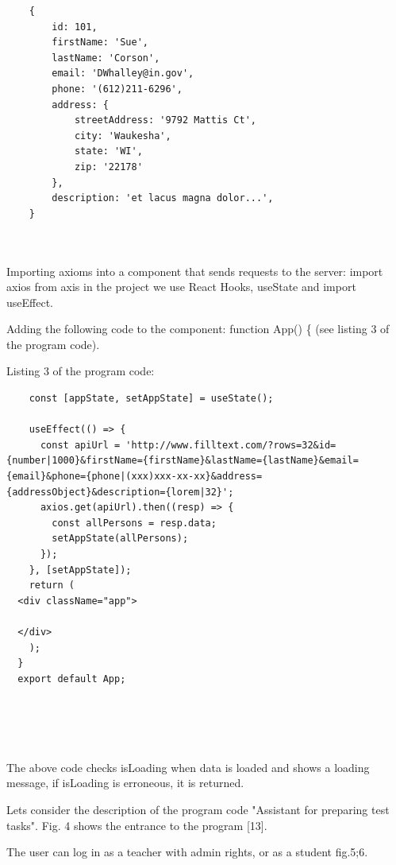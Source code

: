 \begin{lstlisting}
	{
		id: 101,
		firstName: 'Sue',
		lastName: 'Corson',
		email: 'DWhalley@in.gov',
		phone: '(612)211-6296',
		address: {
			streetAddress: '9792 Mattis Ct',
			city: 'Waukesha',
			state: 'WI',
			zip: '22178'
		},
		description: 'et lacus magna dolor...',
	}



\end{lstlisting}

\begin{multicols}{2}


Importing axioms into a component that sends requests to the server:
import axios from \textquotesingle axis\textquotesingle{} in the project
we use React Hooks, useState and import useEffect.

Adding the following code to the component: function App() \{ (see
listing 3 of the program code).

Listing 3 of the program code:
\end{multicols}

\begin{lstlisting}
	const [appState, setAppState] = useState();

	useEffect(() => {
	  const apiUrl = 'http://www.filltext.com/?rows=32&id={number|1000}&firstName={firstName}&lastName={lastName}&email={email}&phone={phone|(xxx)xxx-xx-xx}&address={addressObject}&description={lorem|32}';
	  axios.get(apiUrl).then((resp) => {
		const allPersons = resp.data;
		setAppState(allPersons);
	  });
	}, [setAppState]);
	return (
  <div className="app">
  
  </div>
	);
  }
  export default App;

	
  
  
\end{lstlisting}


\begin{multicols}{2}

The above code checks isLoading when data is loaded and shows a loading
message, if isLoading is erroneous, it is returned.

Let\textquotesingle s consider the description of the program code
"Assistant for preparing test tasks". Fig. 4 shows the entrance to the
program {[}13{]}.
\end{multicols}




\begin{multicols}{2}
The user can log in as a teacher with admin rights, or as a student fig.5;6.
\end{multicols}




